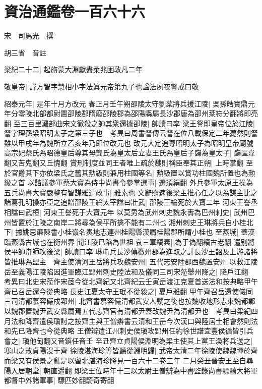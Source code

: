 \chapter{資治通鑑卷一百六十六}
宋　司馬光　撰

胡三省　音註

梁紀二十二|{
	起旃蒙大淵獻盡柔兆困敦凡二年}


敬皇帝|{
	諱方智字慧相小字法眞元帝第九子也諡法夙夜警戒曰敬}


紹泰元年|{
	是年十月方改元}
春正月壬午朔邵陵太守劉棻將兵援江陵|{
	吳孫皓寶鼎元年分零陵北部都尉置邵陵郡隋廢邵陵郡為邵陽縣屬長沙郡唐為邵州棻符分翻將即亮翻}
至三百里灘部曲宋文徹殺之帥其衆還據邵陵|{
	帥讀曰率}
梁王詧即皇帝位於江陵|{
	詧字理孫梁昭明太子之第三子也　考異曰周書詧傳云詧在位八載保定二年薨然則詧雖以甲戌年為魏所立乙亥年乃即位改元也}
改元大定追尊昭明太子為昭明皇帝廟號高宗妃蔡氏為昭德皇后尊其母龔氏為皇太后立妻王氏為皇后子巋為皇太子|{
	巋區韋翻又苦鬼翻又丘愧翻}
賞刑制度並同王者唯上疏於魏則稱臣奉其正朔|{
	上時掌翻}
至於官爵其下亦依梁氏之舊其勲級則兼用柱國等名|{
	勲級置以賞功柱國魏所置也為勲級之首}
以諮議參軍蔡大寶為侍中尚書令參掌選事|{
	選須絹翻}
外兵參軍太原王操為五兵尚書大寶嚴整有智謀雅達政事|{
	雅素也}
文辭贍速後梁主推心任之以為謀主比之諸葛孔明操亦亞之追贈邵陵王綸太宰諡曰壯武|{
	邵陵王綸死於大寶二年}
河東王譽丞相諡曰武桓|{
	河東王譽死于大寶元年}
以莫男為武州刺史魏永夀為巴州刺史|{
	武州巴州皆置於江陵之南岸二將尋為侯平所擒不能有二州也}
湘州刺史王琳將兵自小桂北下|{
	據姚思亷陳書小桂嶺名輿地志連州桂陽縣漢屬桂陽郡所謂小桂也}
至蒸城|{
	蓋漢臨蒸縣古城也在衡州界}
聞江陵已陷為世祖哀三軍縞素|{
	為于偽翻縞古老翻}
遣别將侯平帥舟師攻後梁|{
	帥讀曰率}
琳屯兵長沙傳檄州郡為進取之計長沙王韶及上游諸將皆推琳為盟主　齊主使清河王岳將兵攻魏安州|{
	五代志安陸郡西魏置安州}
以救江陵岳至義陽江陵陷因進軍臨江郢州刺史陸法和及儀同三司宋蒞舉州降之|{
	降戶江翻　考異曰北史宋蒞作宋茝今從北齊紀又北齊紀云壬寅岳渡江克夏首送法和按典略甲午齊已召岳還今從典略}
長史江夏太守王珉不從殺之|{
	夏戶雅翻}
甲午齊召岳還使儀同三司清都慕容儼戍郢州|{
	北齊書慕容儼清都武安人皝之後也按魏收地形志東魏都鄴以魏郡置魏尹武安縣屬焉五代志齊官有清都尹蓋改魏尹為清都尹也　考異曰梁紀四月法和降齊遣侯瑱討之按齊主與王僧辯書云清和王岳今次漢口與陸居士相會然則法和先已降齊也今從典略}
王僧辯遣江州刺史侯瑱攻郢州任約徐世譜宜豐侯循皆引兵會之|{
	瑱他甸翻又音鎭任音壬}
辛丑齊立貞陽侯淵明為梁主使其上黨王渙將兵送之|{
	寒山之敗貞陽沒于齊}
徐陵湛海珍等皆聽從淵明歸|{
	武帝太清二年徐陵使魏魏禪於齊而梁又有侯景之亂是以留北湛海珍降見一百六十二卷三年}
二月癸丑晉安王至自尋陽入居朝堂|{
	朝直遥翻}
即梁王位時年十三以太尉王僧辯為中書監錄尚書驃騎大將軍都督中外諸軍事|{
	驃匹妙翻騎奇寄翻}
